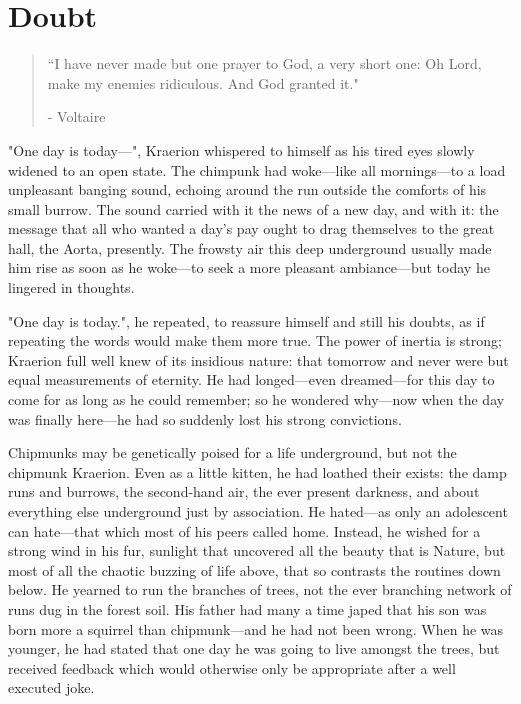 \chapter{Doubt}

\vspace{-1.3cm}
\begin{localsize}{10}
	\begin{quote}
		“I have never made but one prayer to God, a very short one: Oh Lord, make my enemies ridiculous. And God granted it."
		\begin{flushright}- Voltaire \end{flushright}
	\end{quote}
\end{localsize}
\vspace{1cm}


"One day is today---", Kraerion whispered to himself as his tired eyes slowly widened to an open state. The chimpunk had woke---like all mornings---to a load unpleasant banging sound, echoing around the run outside the comforts of his small burrow. The sound carried with it the news of a new day, and with it: the message that all who wanted a day's pay ought to drag themselves to the great hall, the Aorta, presently. The frowsty air this deep underground usually made him rise as soon as he woke---to seek a more pleasant ambiance---but today he lingered in thoughts.

"One day is today.", he repeated, to reassure himself and still his doubts, as if repeating the words would make them more true. The power of inertia is strong; Kraerion full well knew of its insidious nature: that tomorrow and never were but equal measurements of eternity. He had longed---even dreamed---for this day to come for as long as he could remember; so he wondered why---now when the day was finally here---he had so suddenly lost his strong convictions.

Chipmunks may be genetically poised for a life underground, but not the chipmunk Kraerion. Even as a little kitten, he had loathed their exists: the damp runs and burrows, the second-hand air, the ever present darkness, and about everything else underground just by association. He hated---as only an adolescent can hate---that which most of his peers called home.
Instead, he wished for a strong wind in his fur, sunlight that uncovered all the beauty that is Nature, but most of all the chaotic buzzing of life above, that so contrasts the routines down below. He yearned to run the branches of trees, not the ever branching network of runs dug in the forest soil. His father had many a time japed that his son was born more a squirrel than chipmunk---and he had not been wrong. When he was younger, he had stated that one day he was going to live amongst the trees, but received feedback which would otherwise only be appropriate after a well executed joke.

